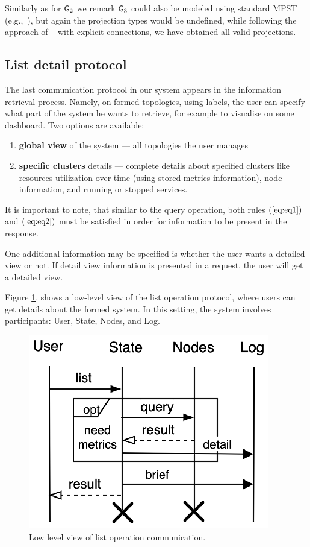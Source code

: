 Similarly as for ${\sf G}_2$ we remark ${\sf G}_3$ could also be modeled using standard MPST (e.g.,~\cite{HondaYC08}), but again the projection types would be undefined, while following the approach of ~\cite{HuY17} with explicit connections, we have obtained all valid projections.
%
%
\subsection{List detail protocol}\label{sec:list_detail_protocol}
%
The last communication protocol in our system appears in the information retrieval process. Namely, on formed topologies, using labels, the user can specify what part of the system he wants to retrieve, for example to visualise on some dashboard. Two options are available: 

\begin{enumerate}[start=1,label={(\bfseries \arabic*)}]
	\item \textbf{global view} of the system --- all topologies the user manages
	\item \textbf{specific clusters} details --- complete details about specified clusters like resources utilization over time (using stored metrics information), node information, and running or stopped services.
\end{enumerate}

It is important to note, that similar to the query operation, both rules $(\ref{eq:eq1})$ and $(\ref{eq:eq2})$ must be satisfied in order for information to be present in the response. 

One additional information may be specified is whether the user wants a detailed view or not. If detail view information is presented in a request, the user will get a detailed view. 

Figure \ref{fig:fig8}. shows a low-level view of the list operation protocol, where users can get details about the formed system. In this setting, the system involves participants: User, State, Nodes, and Log. 

\begin{figure}[!htbp]
	\begin{center}
		\includegraphics[scale=0.9]{images/FIG4}
	\end{center}
	\vspace{-1.2cm}
	\caption{Low level view of list operation communication.}
	\label{fig:fig8}
\end{figure}

